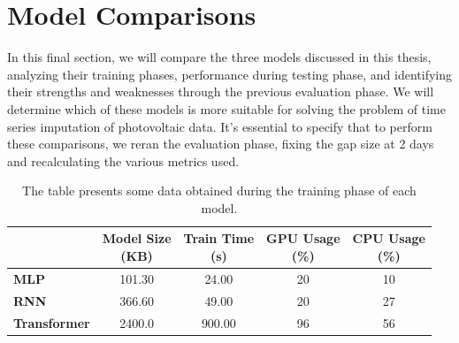 \newpage
\section{Model Comparisons}
In this final section, we will compare the three models discussed in this thesis, analyzing their training phases, performance during testing phase, and identifying their strengths and weaknesses through the previous evaluation phase. We will determine which of these models is more suitable for solving the problem of time series imputation of photovoltaic data. It's essential to specify that to perform these comparisons, we reran the evaluation phase, fixing the gap size at 2 days and recalculating the various metrics used.

%

\begin{table}[H]
	\centering
	\begin{tabular}{l|c|c|c|c}
		                     &
		\makecell{\textbf{Model Size}                                           \\\textbf{(KB)}}
		                     & \makecell{\textbf{Train Time}                    \\\textbf{(s)}}&
		\makecell{\textbf{GPU Usage}                                            \\\textbf{(\%)}} &
		\makecell{\textbf{CPU Usage}                                            \\\textbf{(\%)}}\\
		\hline
		\textbf{MLP}         & 101.30                        & 24.00  & 20 & 10 \\
		\textbf{RNN}         & 366.60                        & 49.00  & 20 & 27 \\
		\textbf{Transformer} & 2400.0                        & 900.00 & 96 & 56
	\end{tabular}
	\caption{The table presents some data obtained during the training phase of each model.}
	\label{tab:cmptrainphase}
\end{table}

